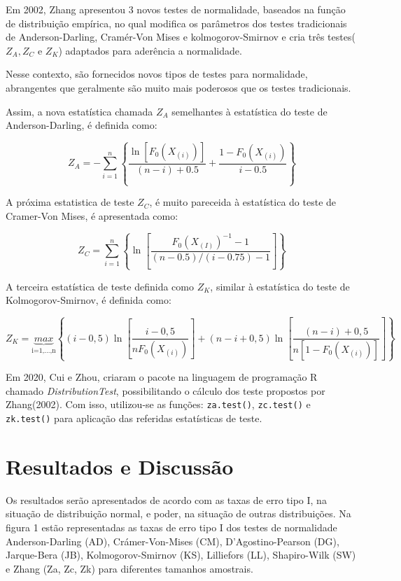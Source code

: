 \documentclass[a4paper,11pt]{article} %
\begin{document}
Em 2002, Zhang apresentou 3 novos testes de normalidade, baseados na função de distribuição empírica, no qual modifica os parâmetros dos testes tradicionais de Anderson-Darling, Cramér-Von Mises e kolmogorov-Smirnov e cria três testes($Z_{A}, Z_{C}$ e $Z_{K}$) adaptados para aderência a normalidade.\vskip0.3cm

Nesse contexto, são fornecidos novos tipos de testes para normalidade, abrangentes que geralmente são muito mais poderosos que os testes tradicionais. \vskip0.3cm

Assim, a nova estatística chamada $Z_{A}$ semelhantes à estatística do teste de Anderson-Darling, é definida como:

\begin{equation}
    Z_{A} = - \sum_{i=1}^{n} \left\{  \frac{ \ln[F_{0}(X_{(i)})]}{(n-i)+0.5} + \frac{1-F_{0}(X_{(i)})}{i-0.5}  \right\}  
\end{equation}

A próxima estatistica de teste $Z_{C}$, é muito pareceida à estatística do teste de Cramer-Von Mises, é apresentada como:

\begin{equation}
    Z_{C} = \sum_{i=1}^{n}  \left\{ \ln\left[ \frac{F_{0}(X_{(I)})^{-1}-1}{(n-0.5)/(i-0.75)-1} \right] \right\}
\end{equation}

A terceira estatística de teste definida como $Z_{K}$, similar à estatística do teste de Kolmogorov-Smirnov, é definida como:

\begin{equation}
Z_{K} = \underbrace{max}_{\mbox{i=1,...,n}} \left\{(i - 0,5) \ln\left[ \frac{i - 0,5}{n F_{0}(X_{(i)})} \right] + (n - i + 0,5) \ln\left[ \dfrac{(n - i) + 0,5}{n[1 - F_{0}(X_{(i)})]} \right] \right\}
\end{equation}

Em 2020, Cui e Zhou, criaram o pacote na linguagem de programação R chamado \textit{DistributionTest}, possibilitando o cálculo dos teste propostos por Zhang(2002). Com isso,  utilizou-se as funções: \texttt{za.test()}, \texttt{zc.test()} e \texttt{zk.test()} para aplicação das referidas estatísticas de teste. \vskip0.3cm



\nempage
\section{Resultados e Discussão}
Os resultados serão apresentados de acordo com as taxas de erro tipo I, na situação de distribuição normal, e poder, na situação de outras distribuições. Na figura 1 estão representadas as taxas de erro tipo I dos testes de normalidade Anderson-Darling (AD), Crámer-Von-Mises (CM), D’Agostino-Pearson (DG), Jarque-Bera (JB), Kolmogorov-Smirnov (KS), Lilliefors (LL), Shapiro-Wilk (SW) e Zhang (Za, Zc, Zk) para diferentes tamanhos amostrais. \vskip0.3cm
\end{document}
